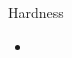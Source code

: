 \documentclass[xcolor={table,dvipsnames,usenames}]{beamer}
\begin{document}
\begin{frame}{Hardness}
\begin{itemize}
	\item 
\end{itemize}
\end{frame}
%
\end{document}
